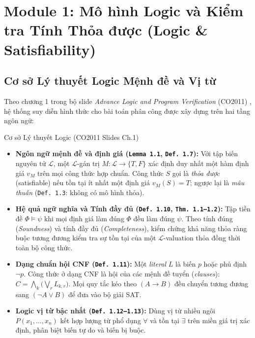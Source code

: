 \section{Module 1: Mô hình Logic và Kiểm tra Tính Thỏa được (Logic \& Satisfiability)}
\label{sec:m1}

\subsection{Cơ sở Lý thuyết Logic Mệnh đề và Vị từ}
Theo chương 1 trong bộ slide \textit{Advance Logic and Program Verification} (CO2011) \cite{slides_logic,huth2004,rosen2019}, hệ thống suy diễn hình thức cho bài toán phân công được xây dựng trên hai tầng ngôn ngữ:

\begin{theorybox}{Cơ sở Lý thuyết Logic (CO2011 Slides Ch.1)}
\begin{itemize}
    \item \textbf{Ngôn ngữ mệnh đề và định giá (\texttt{Lemma 1.1}, \texttt{Def. 1.7}):} Với tập biến nguyên tử $\mathcal{L}$, một $\mathcal{L}$-gán trị $M: \mathcal{L} \to \{T, F\}$ xác định duy nhất một hàm định giá $v_M$ trên mọi công thức hợp chuẩn. Công thức $S$ gọi là \textit{thỏa được} (satisfiable) nếu tồn tại ít nhất một định giá $v_M(S) = T$; ngược lại là \textit{mâu thuẫn} (\texttt{Def. 1.3}: không có mô hình thỏa).
    \item \textbf{Hệ quả ngữ nghĩa và Tính đầy đủ (\texttt{Def. 1.10}, \texttt{Thm. 1.1--1.2}):} Tập tiền đề $\Phi \models \psi$ khi mọi định giá làm đúng $\Phi$ đều làm đúng $\psi$. Theo tính đúng (\textit{Soundness}) và tính đầy đủ (\textit{Completeness}), kiểm chứng khả năng thỏa ràng buộc tương đương kiểm tra sự tồn tại của một $\mathcal{L}$-valuation thỏa đồng thời toàn bộ công thức.
    \item \textbf{Dạng chuẩn hội CNF (\texttt{Def. 1.11}):} Một \textit{literal} $L$ là biến $p$ hoặc phủ định $\neg p$. Công thức ở dạng CNF là hội của các mệnh đề tuyển (\textit{clauses}): $C = \bigwedge_k \big(\bigvee_r L_{k,r}\big)$. Mọi quy tắc kéo theo $(A \to B)$ đều chuyển tương đương sang $(\neg A \lor B)$ để đưa vào bộ giải SAT.
    \item \textbf{Logic vị từ bậc nhất (\texttt{Def. 1.12--1.13}):} Dùng vị từ nhiều ngôi $P(x_1,\dots,x_n)$ kết hợp lượng từ phổ dụng $\forall$ và tồn tại $\exists$ trên miền giá trị xác định, phân biệt biến tự do và biến bị buộc.
\end{itemize}
\end{theorybox}

